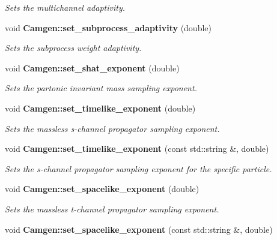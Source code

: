 \begin{DoxyCompactItemize}
\begin{DoxyCompactList}\small\item\em Sets the multichannel adaptivity. \end{DoxyCompactList}\item 
\hypertarget{a00849_af939a054b626ba0508517fc90f5aa285}{void {\bfseries Camgen\-::set\-\_\-subprocess\-\_\-adaptivity} (double)}\label{a00849_af939a054b626ba0508517fc90f5aa285}

\begin{DoxyCompactList}\small\item\em Sets the subprocess weight adaptivity. \end{DoxyCompactList}\item 
\hypertarget{a00849_acd478e4f8ff312797facbc7a9c74d69f}{void {\bfseries Camgen\-::set\-\_\-shat\-\_\-exponent} (double)}\label{a00849_acd478e4f8ff312797facbc7a9c74d69f}

\begin{DoxyCompactList}\small\item\em Sets the partonic invariant mass sampling exponent. \end{DoxyCompactList}\item 
\hypertarget{a00849_ac4bac649996298dbef5922d5ca7dc18d}{void {\bfseries Camgen\-::set\-\_\-timelike\-\_\-exponent} (double)}\label{a00849_ac4bac649996298dbef5922d5ca7dc18d}

\begin{DoxyCompactList}\small\item\em Sets the massless s-\/channel propagator sampling exponent. \end{DoxyCompactList}\item 
void {\bfseries Camgen\-::set\-\_\-timelike\-\_\-exponent} (const std\-::string \&, double)
\begin{DoxyCompactList}\small\item\em Sets the s-\/channel propagator sampling exponent for the specific particle. \end{DoxyCompactList}\item 
\hypertarget{a00849_a3b4a0019472e13464986668d917321e9}{void {\bfseries Camgen\-::set\-\_\-spacelike\-\_\-exponent} (double)}\label{a00849_a3b4a0019472e13464986668d917321e9}

\begin{DoxyCompactList}\small\item\em Sets the massless t-\/channel propagator sampling exponent. \end{DoxyCompactList}\item 
\hypertarget{a00849_a5c96576e6580d80d8661445d7700043f}{void {\bfseries Camgen\-::set\-\_\-spacelike\-\_\-exponent} (const std\-::string \&, double)}\label{a00849_a5c96576e6580d80d8661445d7700043f}


\end{DoxyCompactItemize}
